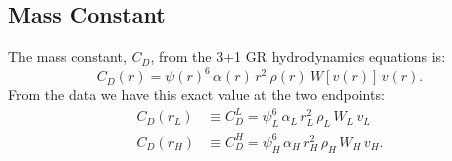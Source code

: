 \documentclass[10pt,preprint]{aastex}
\begin{document}
\subsection{Mass Constant}
The mass constant, $C_{D}$, from the 3+1 GR hydrodynamics equations is:
\begin{equation}
    C_{D}\left(r\right)=\psi\left(r\right)^{6}\,\alpha\left(r\right)\,r^{2}\,\rho\left(r\right)\,W\left[v\left(r\right)\right]\,v\left(r\right).
\end{equation}
From the data we have this exact value at the two endpoints:
\begin{align}
    C_{D}\left(r_{L}\right)&\equiv C^{L}_{D}=\psi_{L}^{6}\,\alpha_{L}\,r_{L}^{2}\,\rho_{L}\,W_{L}\,v_{L}\\
    C_{D}\left(r_{H}\right)&\equiv C^{H}_{D}=\psi_{H}^{6}\,\alpha_{H}\,r_{H}^{2}\,\rho_{H}\,W_{H}\,v_{H}.
\end{align}


\newpage







\end{document}
